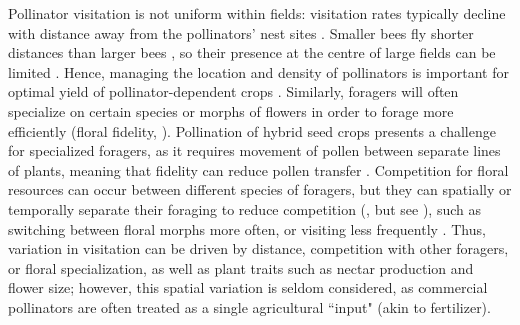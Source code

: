 \documentclass[12pt]{article} %
\begin{document}
Pollinator visitation is not uniform within fields: visitation rates typically decline with distance away from the pollinators' nest sites \citep{Ricketts2008}.
Smaller bees fly shorter distances than larger bees \citep{greenleaf2007,zurbuchen2010}, so their presence at the centre of large fields can be limited \citep{isaacs2010}. 
Hence, managing the location and density of pollinators is important for optimal yield of pollinator-dependent crops \citep{fries1983,cresswell2004b}.
Similarly, foragers will often specialize on certain species or morphs of flowers in order to forage more efficiently (floral fidelity, \citealp{heinrich1976b, goulson1997}). 
Pollination of hybrid seed crops presents a challenge for specialized foragers, as it requires movement of pollen between separate lines of plants, meaning that fidelity can reduce pollen transfer \citep{gaffney2019,waytes2022}.
Competition for floral resources can occur between different species of foragers, but they can spatially or temporally separate their foraging to reduce competition (\citealp{schaffer1979,thomson1987}, but see \citealp{steffan2000}), such as switching between floral morphs more often, or visiting less frequently \citep{heinrich1979, greenleaf2006}.
Thus, variation in visitation can be driven by distance, competition with other foragers, or floral specialization, as well as plant traits such as nectar production and flower size; however, this spatial variation is seldom considered, as commercial pollinators are often treated as a single agricultural ``input" (akin to fertilizer).
\end{document}
